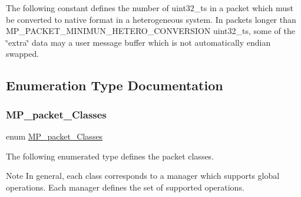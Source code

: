 The following constant defines the number of uint32\+\_\+t\textquotesingle{}s in a packet which must be converted to native format in a heterogeneous system. In packets longer than M\+P\+\_\+\+P\+A\+C\+K\+E\+T\+\_\+\+M\+I\+N\+I\+M\+U\+N\+\_\+\+H\+E\+T\+E\+R\+O\+\_\+\+C\+O\+N\+V\+E\+R\+S\+I\+ON uint32\+\_\+t\textquotesingle{}s, some of the \char`\"{}extra\char`\"{} data may a user message buffer which is not automatically endian swapped. 

\subsection{Enumeration Type Documentation}
\mbox{\label{group__RTEMSScoreMPPacket_gafed9717210f8917e5acb8e63f2c6bac3}} 
\subsubsection{\texorpdfstring{MP\_packet\_Classes}{MP\_packet\_Classes}}
{\footnotesize\ttfamily enum \mbox{\hyperlink{group__RTEMSScoreMPPacket_gafed9717210f8917e5acb8e63f2c6bac3}{M\+P\+\_\+packet\+\_\+\+Classes}}}

The following enumerated type defines the packet classes.

\begin{DoxyNote}{Note}
In general, each class corresponds to a manager which supports global operations. Each manager defines the set of supported operations. 
\end{DoxyNote}

